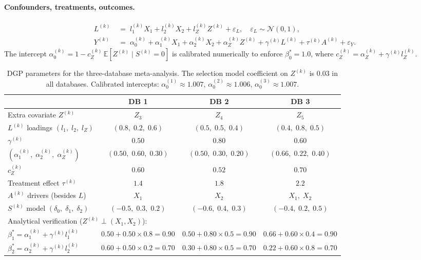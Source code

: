 \paragraph{Confounders, treatments, outcomes.}
\begin{align}
  L^{(k)} &\;=\; l_1^{(k)} X_1 + l_2^{(k)} X_2 + l_Z^{(k)} Z^{(k)}
                 + \varepsilon_L, \quad \varepsilon_L \sim \mathcal{N}(0,1), \\
  Y^{(k)} &\;=\; \alpha_0^{(k)} + \alpha_1^{(k)} X_1 + \alpha_2^{(k)} X_2
                 + \alpha_Z^{(k)} Z^{(k)} + \gamma^{(k)} L^{(k)}
                 + \tau^{(k)} A^{(k)} + \varepsilon_Y.
\end{align}
The intercept $\alpha_0^{(k)} = 1 - c_Z^{(k)}\,\mathbb{E}[Z^{(k)}\mid S^{(k)}=0]$
is calibrated numerically to enforce $\beta_0^* = 1.0$,
where $c_Z^{(k)} = \alpha_Z^{(k)} + \gamma^{(k)} l_Z^{(k)}$.

\begin{table}[h]
\centering
\caption{DGP parameters for the three-database meta-analysis.
  The selection model coefficient on $Z^{(k)}$ is $0.03$ in all databases.
  Calibrated intercepts: $\alpha_0^{(1)} \approx 1.007$,
  $\alpha_0^{(2)} \approx 1.006$, $\alpha_0^{(3)} \approx 1.007$.}
\label{tab:meta-dgp}
\begin{tabular}{lccc}
  \toprule
  & \textbf{DB 1} & \textbf{DB 2} & \textbf{DB 3} \\
  \midrule
  Extra covariate $Z^{(k)}$ & $Z_3$ & $Z_4$ & $Z_5$ \\
  $L^{(k)}$ loadings $(l_1,\;l_2,\;l_Z)$
    & $(0.8,\;0.2,\;0.6)$ & $(0.5,\;0.5,\;0.4)$ & $(0.4,\;0.8,\;0.5)$ \\
  $\gamma^{(k)}$ & $0.50$ & $0.80$ & $0.60$ \\
  $(\alpha_1^{(k)},\;\alpha_2^{(k)},\;\alpha_Z^{(k)})$
    & $(0.50,\;0.60,\;0.30)$ & $(0.50,\;0.30,\;0.20)$ & $(0.66,\;0.22,\;0.40)$ \\
  $c_Z^{(k)}$ & $0.60$ & $0.52$ & $0.70$ \\
  Treatment effect $\tau^{(k)}$ & $1.4$ & $1.8$ & $2.2$ \\
  $A^{(k)}$ drivers (besides $L$) & $X_1$ & $X_2$ & $X_1,\;X_2$ \\
  $S^{(k)}$ model $(\delta_0,\;\delta_1,\;\delta_2)$
    & $(-0.5,\;0.3,\;0.2)$ & $(-0.6,\;0.4,\;0.3)$ & $(-0.4,\;0.2,\;0.5)$ \\
  \midrule
  \multicolumn{4}{l}{\small Analytical verification ($Z^{(k)}\perp(X_1,X_2)$):} \\
  $\beta_1^* = \alpha_1^{(k)}+\gamma^{(k)}l_1^{(k)}$
    & $0.50+0.50\times0.8 = 0.90$ & $0.50+0.80\times0.5 = 0.90$
    & $0.66+0.60\times0.4 = 0.90$ \\
  $\beta_2^* = \alpha_2^{(k)}+\gamma^{(k)}l_2^{(k)}$
    & $0.60+0.50\times0.2 = 0.70$ & $0.30+0.80\times0.5 = 0.70$
    & $0.22+0.60\times0.8 = 0.70$ \\
  \bottomrule
\end{tabular}
\end{table}

